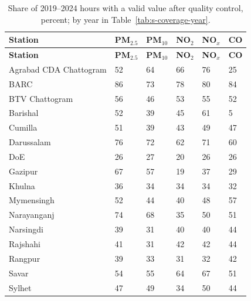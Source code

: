 \begingroup\small
\begin{longtable}{L{4.2cm} C{1.8cm} C{1.8cm} C{1.8cm} C{1.8cm} C{1.8cm}}
\caption{Share of 2019--2024 hours with a valid value after quality control, percent; by year in Table~\ref{tab:s-coverage-year}.}\label{tab:s-coverage}\\
\toprule
\textbf{Station} & \textbf{PM$_{2.5}$} & \textbf{PM$_{10}$} & \textbf{NO$_2$} & \textbf{NO$_x$} & \textbf{CO} \\
\midrule\endfirsthead
\toprule
\textbf{Station} & \textbf{PM$_{2.5}$} & \textbf{PM$_{10}$} & \textbf{NO$_2$} & \textbf{NO$_x$} & \textbf{CO} \\
\midrule\endhead
\bottomrule\endfoot
Agrabad CDA Chattogram & 52 & 64 & 66 & 76 & 25 \\
BARC & 86 & 73 & 78 & 80 & 84 \\
BTV Chattogram & 56 & 46 & 53 & 55 & 52 \\
Barishal & 52 & 39 & 45 & 61 & 5 \\
Cumilla & 51 & 39 & 43 & 49 & 47 \\
Darussalam & 76 & 72 & 62 & 71 & 60 \\
DoE & 26 & 27 & 20 & 26 & 26 \\
Gazipur & 67 & 57 & 19 & 37 & 29 \\
Khulna & 36 & 34 & 34 & 34 & 32 \\
Mymensingh & 52 & 44 & 40 & 48 & 57 \\
Narayanganj & 74 & 68 & 35 & 50 & 51 \\
Narsingdi & 39 & 31 & 40 & 40 & 44 \\
Rajshahi & 41 & 31 & 42 & 42 & 44 \\
Rangpur & 39 & 33 & 31 & 32 & 42 \\
Savar & 54 & 55 & 64 & 67 & 51 \\
Sylhet & 47 & 49 & 34 & 50 & 44 \\
\end{longtable}
\endgroup
